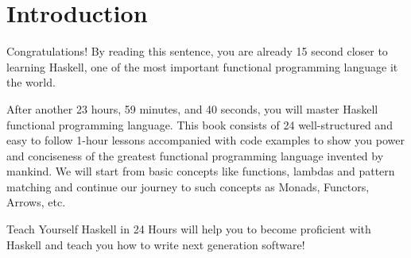 \chapter*{Introduction}

Congratulations! By reading this sentence, you are already 15 second closer to
learning Haskell, one of the most important functional programming language it
the world.

After another 23 hours, 59 minutes, and 40 seconds, you will master Haskell
functional programming language. This book consists of 24 well-structured
and easy to follow 1-hour lessons accompanied with code examples to show
you power and conciseness of the greatest functional programming language
invented by mankind. We will start from basic concepts like functions, lambdas
and pattern matching and continue our journey to such concepts as Monads,
Functors, Arrows, etc.

Teach Yourself Haskell in 24 Hours will help you to become proficient
with Haskell and teach you how to write next generation software!